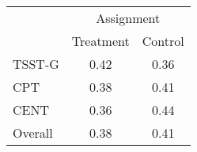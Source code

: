 {
\def\sym#1{\ifmmode^{#1}\else\(^{#1}\)\fi}
\begin{tabular}{l*{2}{c}}
\toprule
          &\multicolumn{2}{c}{Assignment}\\\cmidrule(lr){2-3}
          &\multicolumn{1}{c}{Treatment}&\multicolumn{1}{c}{Control}\\
\midrule
TSST-G    &     0.42&     0.36\\
CPT       &     0.38&     0.41\\
CENT      &     0.36&     0.44\\
\midrule Overall&     0.38&     0.41\\
\bottomrule
\end{tabular}
}
